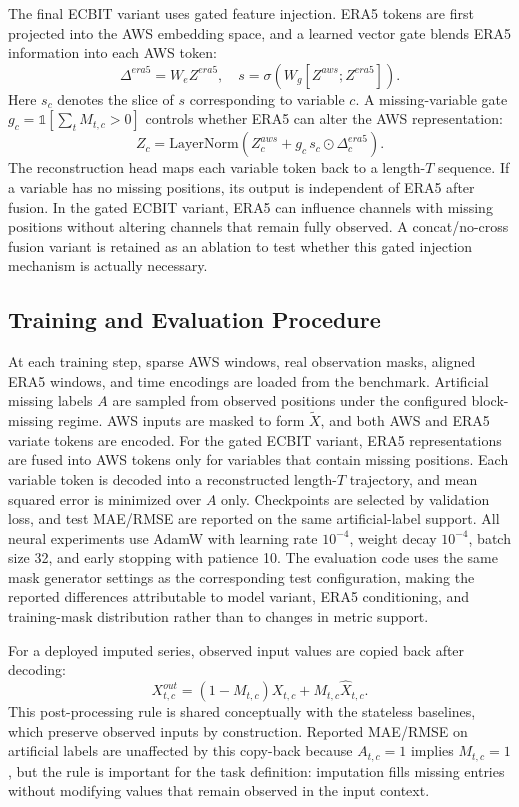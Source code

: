 The final ECBIT variant uses gated feature injection. ERA5 tokens are first projected into the AWS embedding space, and a learned vector gate blends ERA5 information into each AWS token:
\begin{equation}
\Delta^{era5} = W_e Z^{era5}, \quad
s = \sigma(W_g [Z^{aws}; Z^{era5}]).
\end{equation}
Here $s_c$ denotes the slice of $s$ corresponding to variable $c$. A missing-variable gate $g_c=\mathbb{1}[\sum_t M_{t,c}>0]$ controls whether ERA5 can alter the AWS representation:
\begin{equation}
Z_c = \mathrm{LayerNorm}(Z^{aws}_c + g_c\, s_c \odot \Delta^{era5}_c).
\end{equation}
The reconstruction head maps each variable token back to a length-$T$ sequence. If a variable has no missing positions, its output is independent of ERA5 after fusion. In the gated ECBIT variant, ERA5 can influence channels with missing positions without altering channels that remain fully observed. A concat/no-cross fusion variant is retained as an ablation to test whether this gated injection mechanism is actually necessary.

\subsection{Training and Evaluation Procedure}
At each training step, sparse AWS windows, real observation masks, aligned ERA5 windows, and time encodings are loaded from the benchmark. Artificial missing labels $A$ are sampled from observed positions under the configured block-missing regime. AWS inputs are masked to form $\tilde{X}$, and both AWS and ERA5 variate tokens are encoded. For the gated ECBIT variant, ERA5 representations are fused into AWS tokens only for variables that contain missing positions. Each variable token is decoded into a reconstructed length-$T$ trajectory, and mean squared error is minimized over $A$ only. Checkpoints are selected by validation loss, and test MAE/RMSE are reported on the same artificial-label support.
All neural experiments use AdamW with learning rate $10^{-4}$, weight decay $10^{-4}$, batch size 32, and early stopping with patience 10. The evaluation code uses the same mask generator settings as the corresponding test configuration, making the reported differences attributable to model variant, ERA5 conditioning, and training-mask distribution rather than to changes in metric support.

For a deployed imputed series, observed input values are copied back after decoding:
\begin{equation}
X^{out}_{t,c} = (1-M_{t,c})X_{t,c} + M_{t,c}\hat{X}_{t,c}.
\label{eq:copy-back}
\end{equation}
This post-processing rule is shared conceptually with the stateless baselines, which preserve observed inputs by construction. Reported MAE/RMSE on artificial labels are unaffected by this copy-back because $A_{t,c}=1$ implies $M_{t,c}=1$, but the rule is important for the task definition: imputation fills missing entries without modifying values that remain observed in the input context.
